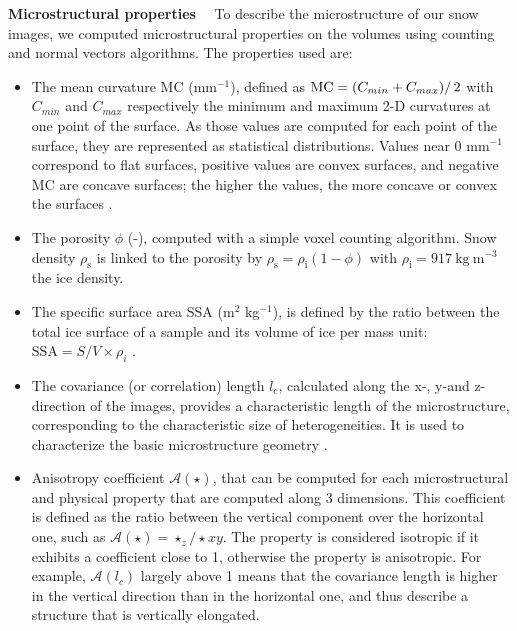 \documentclass[draft,ms]{agujournal2019}
\begin{document}
\noindent \textbf{Microstructural properties}$\quad$ To describe the microstructure of our snow images, we computed microstructural properties on the volumes using counting and normal vectors algorithms. The properties used are:
\begin{itemize}

    \item The mean curvature MC (mm$^{-1}$), defined as $\mathrm{MC} = \left(C_{min} + C_{max})\right/2$ with $C_{min}$ and $C_{max}$ respectively the minimum and maximum 2-D curvatures at one point of the surface. As those values are computed for each point of the surface, they are represented as statistical distributions. Values near 0 mm$^{-1}$ correspond to flat surfaces, positive values are convex surfaces, and negative MC are concave surfaces; the higher the values, the more concave or convex the surfaces \cite{flin_three-dimensional_2004, brzoska2007using, wang2012curvature}. 
    
    \item The porosity $\phi$ (-), computed with a simple voxel counting algorithm. Snow density $\rho_{\mathrm{s}}$ is linked to the porosity  by $\rho_{\mathrm{s}}=\rho_{\mathrm{i}}(1-\phi)$ with $\rho_{\mathrm{i}}=917\ \mathrm{kg\ m^{-3}}$ the ice density.
 
    \item The specific surface area SSA (m$^2$ kg$^{-1}$), is defined by the ratio between the total ice surface of a sample and its volume of ice per mass unit: $\mathrm{SSA}=S/V \times \rho_{i}$ \cite{flin2011computations, berryman1998planar}.
    
    \item  The covariance (or correlation) length $l_{c}$, calculated along the x-, y-and z- direction of the images, provides a characteristic length of the microstructure, corresponding to the characteristic size of heterogeneities. It is used to characterize the basic microstructure geometry \cite{lowe2013general}. 
    
    \item Anisotropy coefficient
    $\mathcal{A}(\star)$, that can be computed for each microstructural and physical property that are computed along 3 dimensions. This coefficient is defined as the ratio between the vertical component over the horizontal one, such as $\mathcal{A}(\star)=\star_{z} / \star x y$. The property is considered isotropic if it exhibits a coefficient close to 1, otherwise the property is anisotropic. For example, $\mathcal{A}(l_c)$ largely above 1 means that the covariance length is higher in the vertical direction than in the horizontal one, and thus describe a structure that is vertically elongated.
\end{itemize}
\end{document}
